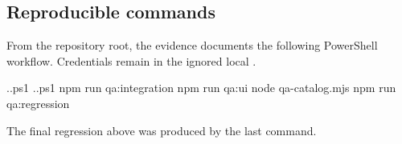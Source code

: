 \subsection{Reproducible commands}

From the repository root, the evidence documents the following PowerShell
workflow. Credentials remain in the ignored local .

\begin{CodeBlock}
.\qa\testlink\setup.ps1
.\qa\testlink\verify.ps1
npm run qa:integration
npm run qa:ui
node qa\automation-catalog.mjs
npm run qa:regression
\end{CodeBlock}

The final regression above was produced by the last command.
